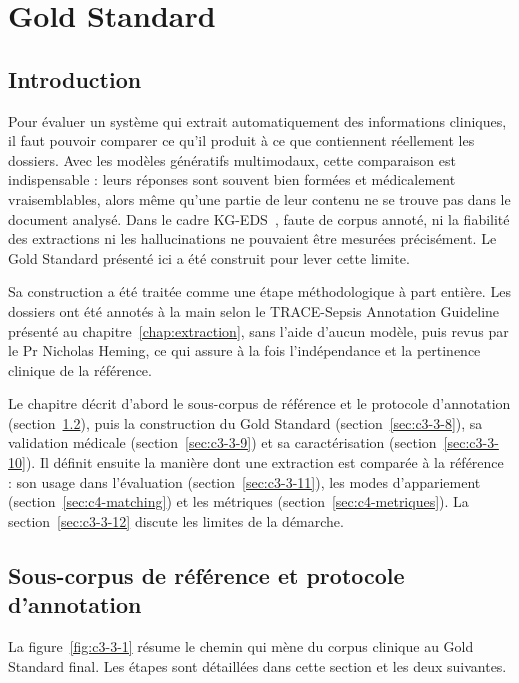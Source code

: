 \chapter{Gold Standard}
\label{chap:donnees-gold}

\section{Introduction}\label{sec:c4g-intro}

Pour évaluer un système qui extrait automatiquement des informations cliniques, il faut pouvoir comparer ce qu'il produit à ce que contiennent réellement les dossiers. Avec les modèles génératifs multimodaux, cette comparaison est indispensable : leurs réponses sont souvent bien formées et médicalement vraisemblables, alors même qu'une partie de leur contenu ne se trouve pas dans le document analysé. Dans le cadre KG-EDS~\cite{kgeds}, faute de corpus annoté, ni la fiabilité des extractions ni les hallucinations ne pouvaient être mesurées précisément. Le Gold Standard présenté ici a été construit pour lever cette limite.

Sa construction a été traitée comme une étape méthodologique à part entière. Les dossiers ont été annotés à la main selon le TRACE-Sepsis Annotation Guideline présenté au chapitre~\ref{chap:extraction}, sans l'aide d'aucun modèle, puis revus par le Pr Nicholas Heming, ce qui assure à la fois l'indépendance et la pertinence clinique de la référence.

Le chapitre décrit d'abord le sous-corpus de référence et le protocole d'annotation (section~\ref{sec:c3-3-7}), puis la construction du Gold Standard (section~\ref{sec:c3-3-8}), sa validation médicale (section~\ref{sec:c3-3-9}) et sa caractérisation (section~\ref{sec:c3-3-10}). Il définit ensuite la manière dont une extraction est comparée à la référence : son usage dans l'évaluation (section~\ref{sec:c3-3-11}), les modes d'appariement (section~\ref{sec:c4-matching}) et les métriques (section~\ref{sec:c4-metriques}). La section~\ref{sec:c3-3-12} discute les limites de la démarche.

\section{Sous-corpus de référence et protocole d’annotation}\label{sec:c3-3-7}

La figure~\ref{fig:c3-3-1} résume le chemin qui mène du corpus clinique au Gold Standard final. Les étapes sont détaillées dans cette section et les deux suivantes.

